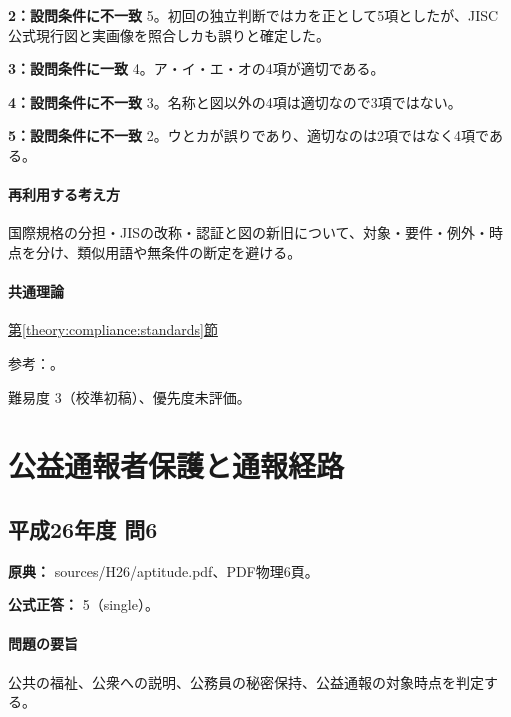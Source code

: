 \noindent\textbf{2：設問条件に不一致} 5。初回の独立判断ではカを正として5項としたが、JISC公式現行図と実画像を照合しカも誤りと確定した。\par

\noindent\textbf{3：設問条件に一致} 4。ア・イ・エ・オの4項が適切である。\par

\noindent\textbf{4：設問条件に不一致} 3。名称と図以外の4項は適切なので3項ではない。\par

\noindent\textbf{5：設問条件に不一致} 2。ウとカが誤りであり、適切なのは2項ではなく4項である。\par

\paragraph{再利用する考え方} 国際規格の分担・JISの改称・認証と図の新旧について、対象・要件・例外・時点を分け、類似用語や無条件の断定を避ける。

\paragraph{共通理論} \hyperref[theory:compliance:standards]{第\ref*{theory:compliance:standards}節}

\par 参考：\cite{jisc_isoiec,jisc_certification,jisc_marks,meti_jis2019,mhlw_jis_history}。

\par 難易度 3（校準初稿）、優先度未評価。

\section{公益通報者保護と通報経路}

\subsection{平成26年度 問6}
\label{q:h26-reg-apt-06}

\noindent\textbf{原典：} sources/H26/aptitude.pdf、PDF物理6頁。

\textbf{公式正答：} 5（single）。

\paragraph{問題の要旨} 公共の福祉、公衆への説明、公務員の秘密保持、公益通報の対象時点を判定する。

